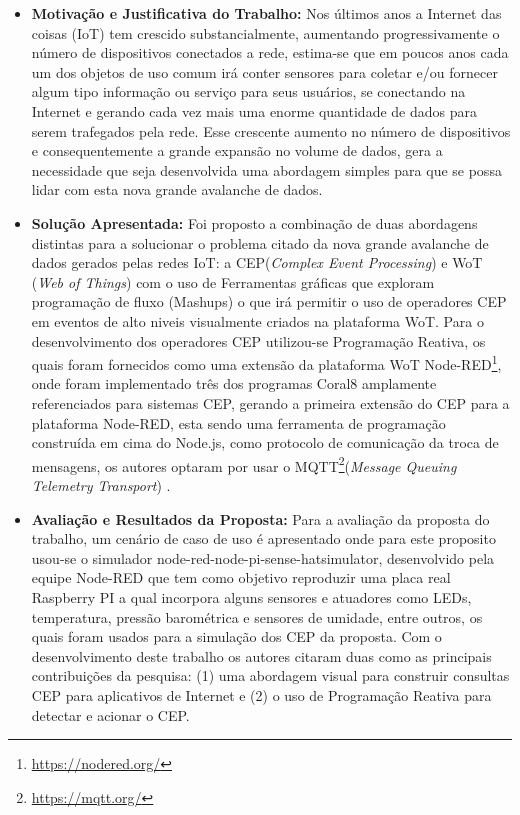 \documentclass[tid,table]{texufpel} %
\begin{document}
\begin{itemize}
	\item \textbf{Motivação e Justificativa do Trabalho:} Nos últimos anos a Internet das coisas (IoT) tem crescido substancialmente, aumentando progressivamente o número de dispositivos conectados a rede, estima-se que em poucos anos cada um dos objetos de uso comum irá conter sensores para coletar e/ou fornecer algum tipo informação ou serviço para seus usuários, se conectando na Internet e gerando cada vez mais uma enorme quantidade de dados para serem trafegados pela rede. Esse crescente aumento no número de dispositivos e consequentemente a grande expansão no volume de dados, gera a necessidade que seja desenvolvida uma abordagem simples para que se possa lidar com esta nova grande avalanche de dados.
	
	\item \textbf{Solução Apresentada:}  Foi proposto a combinação de duas abordagens distintas para a solucionar o problema citado da nova grande avalanche de dados gerados pelas redes IoT: a CEP(\textit{Complex Event Processing}) e WoT (\textit{Web of Things}) com o uso de Ferramentas gráficas que exploram programação de fluxo (Mashups) o que irá permitir o uso de operadores CEP em eventos de alto niveis visualmente criados na plataforma WoT.
	Para o desenvolvimento dos operadores CEP utilizou-se Programação Reativa, os quais foram fornecidos como uma extensão da plataforma WoT Node-RED\footnote{\url{https://nodered.org/}}, onde foram implementado três dos programas Coral8 amplamente referenciados para sistemas CEP, gerando a primeira extensão do CEP para a plataforma Node-RED, esta sendo uma ferramenta de programação construída em cima do Node.js, como protocolo de comunicação da troca de mensagens, os autores optaram por usar o MQTT\footnote{\url{https://mqtt.org/}}(\textit{Message Queuing Telemetry Transport}) . 	
	
	\item \textbf{Avaliação e Resultados da Proposta:} Para a avaliação da proposta do trabalho, um cenário de caso de uso é apresentado onde para este proposito usou-se o simulador node-red-node-pi-sense-hatsimulator, desenvolvido pela equipe Node-RED que tem como objetivo reproduzir uma placa real Raspberry PI a qual incorpora alguns sensores e atuadores como LEDs, temperatura, pressão barométrica e sensores de umidade, entre outros, os quais foram usados para a simulação dos CEP da proposta. Com o desenvolvimento deste trabalho os autores citaram duas como as principais contribuições da pesquisa: (1) uma abordagem visual para construir consultas CEP para aplicativos de Internet e (2) o uso de Programação Reativa para detectar e acionar o CEP.
	
\end{itemize}
\end{document}
